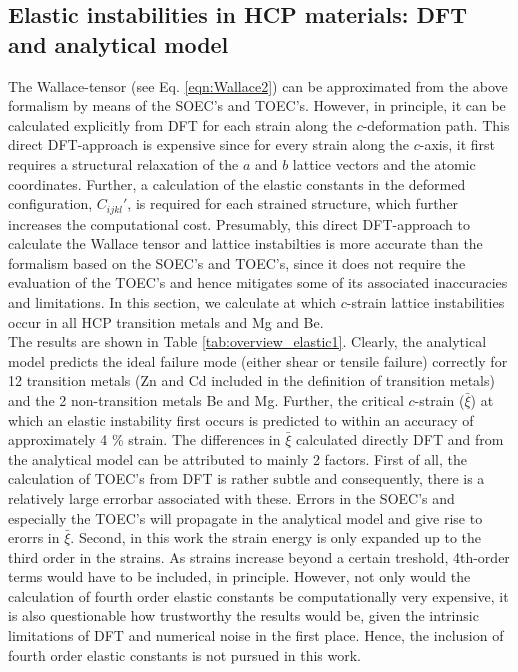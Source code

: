 \documentclass[showpacs,aps,floatfix,prb,reprint,superscriptaddress]{revtex4-1}
\begin{document}
\subsection{Elastic instabilities in HCP materials: DFT and analytical model}
The Wallace-tensor (see Eq. \ref{eqn:Wallace2}) can be approximated from the above formalism by means of the SOEC's and TOEC's. However, in principle, it can be calculated explicitly from DFT for each strain along the $c$-deformation path. This direct DFT-approach is expensive since for every strain along the $c$-axis, it first requires a structural relaxation of the $a$ and $b$ lattice vectors and the atomic coordinates. Further, a calculation of the elastic constants in the deformed configuration, $C_{ijkl}'$, is required for each strained structure, which further increases the computational cost. Presumably, this direct DFT-approach to calculate the Wallace tensor and lattice instabilties is more accurate than the formalism based on the SOEC's and TOEC's, since it does not require the evaluation of the TOEC's and hence mitigates some of its associated inaccuracies and limitations. In this section, we calculate at which $c$-strain lattice instabilities occur in all HCP transition metals and Mg and Be. \\

The results are shown in Table \ref{tab:overview_elastic1}. Clearly, the analytical model predicts the ideal failure mode (either shear or tensile failure) correctly for 12 transition metals (Zn and Cd included in the definition of transition metals) and the 2 non-transition metals Be and Mg. Further, the critical $c$-strain ($\bar{\xi}$) at which an elastic instability first occurs is predicted to within an accuracy of approximately 4 \% strain. The differences in $\bar{\xi}$ calculated directly DFT and from the analytical model can be attributed to mainly 2 factors. First of all, the calculation of TOEC's from DFT is rather subtle and consequently, there is a relatively large errorbar associated with these. Errors in the SOEC's and especially the TOEC's will propagate in the analytical model and give rise to erorrs in $\bar{\xi}$. Second, in this work the strain energy is only expanded up to the third order in the strains. As strains increase beyond a certain treshold, 4th-order terms would have to be included, in principle. However, not only would the calculation of fourth order elastic constants be computationally very expensive, it is also questionable how trustworthy the results would be, given the intrinsic limitations of DFT and numerical noise in the first place. Hence, the inclusion of fourth order elastic constants is not pursued in this work. 
\end{document}
